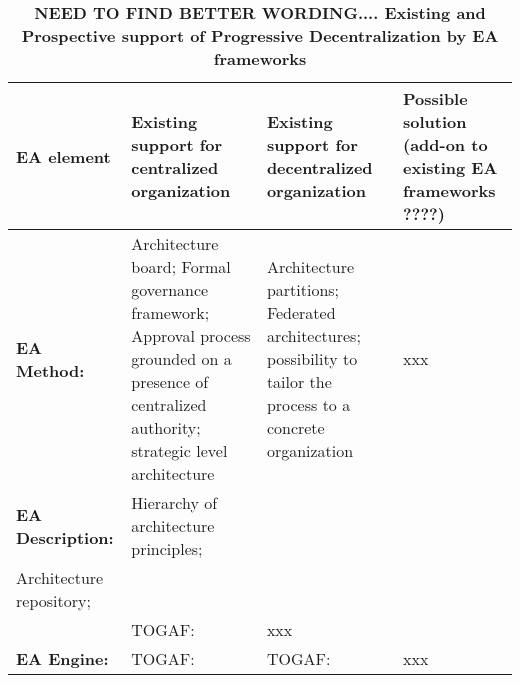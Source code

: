 \begin{table*}
\caption{\textbf{ NEED TO FIND BETTER WORDING.... Existing and Prospective support of Progressive Decentralization by EA frameworks}}
\label{summary}
\begin{tabular}{ | l | p{}| p{} | p{}|}
\hline
EA element &  Existing support for centralized organization & Existing support for decentralized organization &  Possible solution (add-on to existing EA frameworks ????)\\ \hline
\textbf{EA Method:} & Architecture board; Formal governance framework;  Approval process grounded on a presence of centralized authority; strategic level architecture   & Architecture partitions; Federated architectures; possibility to tailor the process to a concrete organization &  xxx \\ \hline


\textbf{EA Description:} & Hierarchy of architecture principles; \\ Architecture repository; \\ & TOGAF: &  xxx\\ \hline


\textbf{EA Engine:} & TOGAF: & TOGAF: &  xxx\\
\end{tabular}
\end{table*}
